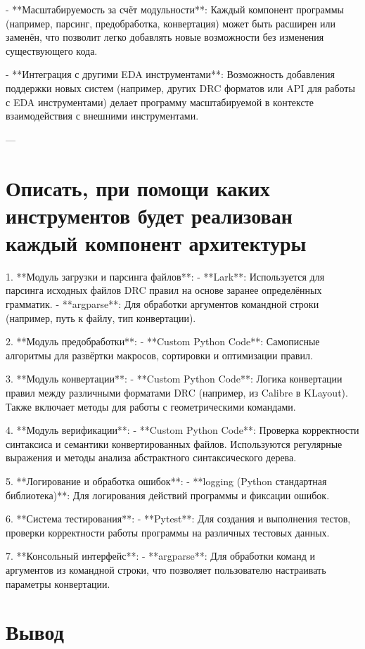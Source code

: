 - **Масштабируемость за счёт модульности**: Каждый компонент программы (например, парсинг, предобработка, конвертация) может быть расширен или заменён, что позволит легко добавлять новые возможности без изменения существующего кода.
  
- **Интеграция с другими EDA инструментами**: Возможность добавления поддержки новых систем (например, других DRC форматов или API для работы с EDA инструментами) делает программу масштабируемой в контексте взаимодействия с внешними инструментами.

---

\section{Описать, при помощи каких инструментов будет реализован каждый компонент архитектуры}

1. **Модуль загрузки и парсинга файлов**:
   - **Lark**: Используется для парсинга исходных файлов DRC правил на основе заранее определённых грамматик.
   - **argparse**: Для обработки аргументов командной строки (например, путь к файлу, тип конвертации).

2. **Модуль предобработки**:
   - **Custom Python Code**: Самописные алгоритмы для развёртки макросов, сортировки и оптимизации правил.

3. **Модуль конвертации**:
   - **Custom Python Code**: Логика конвертации правил между различными форматами DRC (например, из Calibre в KLayout). Также включает методы для работы с геометрическими командами.

4. **Модуль верификации**:
   - **Custom Python Code**: Проверка корректности синтаксиса и семантики конвертированных файлов. Используются регулярные выражения и методы анализа абстрактного синтаксического дерева.

5. **Логирование и обработка ошибок**:
   - **logging (Python стандартная библиотека)**: Для логирования действий программы и фиксации ошибок.
  
6. **Система тестирования**:
   - **Pytest**: Для создания и выполнения тестов, проверки корректности работы программы на различных тестовых данных.

7. **Консольный интерфейс**:
   - **argparse**: Для обработки команд и аргументов из командной строки, что позволяет пользователю настраивать параметры конвертации.


\clearpage

\section*{\LARGE Вывод}

